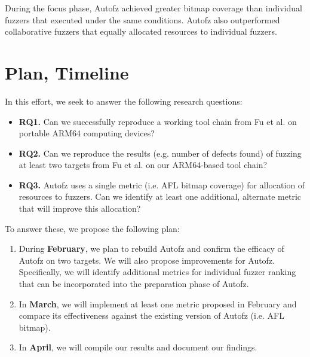 During the focus phase, Autofz achieved greater bitmap coverage than individual 
fuzzers that executed under the same conditions. Autofz also outperformed 
collaborative fuzzers that equally allocated resources to individual fuzzers. 
\cite{Fu}

\section{Plan, Timeline}
In this effort, we seek to answer the following research questions:

\begin{itemize}
    \item \textbf{RQ1.} Can we successfully reproduce a working tool chain from 
    Fu et al. \cite{Fu} on portable ARM64 computing devices?
    \item \textbf{RQ2.} Can we reproduce the results (e.g. number of defects found)
     of fuzzing at least two targets from Fu et al. \cite{Fu} on our ARM64-based
      tool chain?
    \item \textbf{RQ3.} Autofz uses a single metric (i.e. AFL bitmap coverage) for
     allocation of resources to fuzzers. Can we identify at least one additional, 
     alternate metric that will improve this allocation?
\end{itemize}

To answer these, we propose the following plan:

\begin{enumerate}
    \item During \textbf{February}, we plan to rebuild Autofz and confirm the efficacy
    of Autofz on two targets. We will also propose improvements for Autofz. Specifically,
     we will identify additional metrics for individual fuzzer ranking that can be 
     incorporated into the preparation phase of Autofz. 

    \item In \textbf{March}, we will implement at least one metric proposed in February
     and compare its effectiveness against the existing version of Autofz (i.e. AFL bitmap).

    \item In \textbf{April}, we will compile our results and document our findings.
\end{enumerate}

